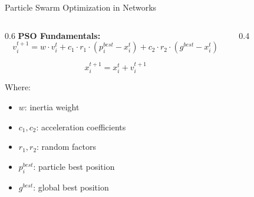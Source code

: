 \documentclass[10pt]{beamer}
\begin{document}
\begin{frame}{Particle Swarm Optimization in Networks}
    \begin{columns}
        \begin{column}{0.6\textwidth}
            \textbf{PSO Fundamentals:}
            \begin{equation}
                v_{i}^{t+1} = w \cdot v_{i}^{t} + c_1 \cdot r_1 \cdot (p_{i}^{best} - x_{i}^{t}) + c_2 \cdot r_2 \cdot (g^{best} - x_{i}^{t})
            \end{equation}
            
            \begin{equation}
                x_{i}^{t+1} = x_{i}^{t} + v_{i}^{t+1}
            \end{equation}
            
            Where:
            \begin{itemize}
                \item $w$: inertia weight
                \item $c_1, c_2$: acceleration coefficients
                \item $r_1, r_2$: random factors
                \item $p_{i}^{best}$: particle best position
                \item $g^{best}$: global best position
            \end{itemize}
        \end{column}
        \begin{column}{0.4\textwidth}
            \begin{figure}
                \centering
            \end{figure}
        \end{column}
    \end{columns}
\end{frame}
\end{document}
